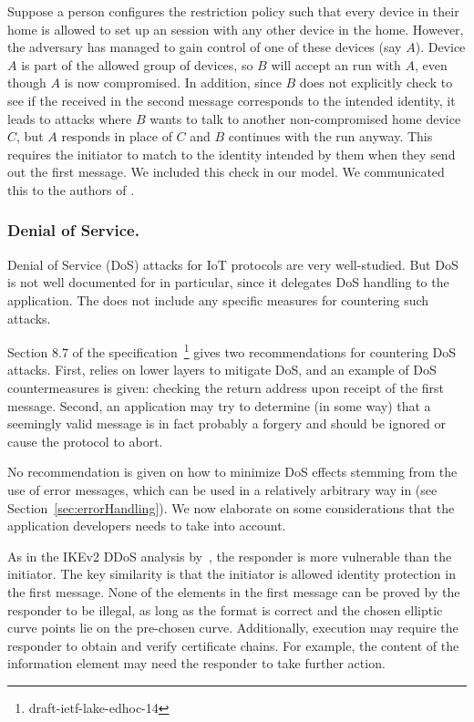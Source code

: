 \documentclass[runningheads]{llncs}
\begin{document}
Suppose a person configures the restriction policy such that every device in their home is allowed to set up an \mEdhoc{} session with any other device in the home.
%
However, the adversary has managed to gain control of one of these devices (say $A$).
%
Device $A$ is part of the allowed group of devices, so $B$ will accept an \mEdhoc{} run with $A$, even though $A$ is now compromised.
%
In addition, since $B$ does not explicitly check to see if the \mIdcredr{} received in the second message corresponds to the intended identity, it leads to attacks where $B$ wants to talk to another non-compromised home device $C$, but $A$ responds in place of $C$ and $B$ continues with the run anyway.
%
This requires the initiator to match \mIdcredr{} to the identity intended by them when they send out the first message.
%
We included this check in our model.
%
We communicated this to the authors of \mEdhoc{}.

\subsubsection{Denial of Service.}
Denial of Service (DoS) attacks for IoT protocols are very well-studied.
%
But DoS is not well documented for \mEdhoc{} in particular, since it delegates DoS handling to the application.
%
The \mSpec{} does not include any specific measures for countering such attacks.

Section 8.7 of the \mEdhoc{} specification~\footnote{draft-ietf-lake-edhoc-14} gives two recommendations for countering DoS attacks.
%
First, \mEdhoc{} relies on lower layers to mitigate DoS, and an example of DoS countermeasures is given: checking the return address upon receipt of the first message.
%
Second, an application may try to determine (in some way) that a seemingly valid message is in fact probably a forgery and should be ignored or cause the protocol to abort.

No recommendation is given on how to minimize DoS effects stemming from the use of error messages, which can be used in a relatively arbitrary way in \mEdhoc{} (see Section~\ref{sec:errorHandling}).
%
We now elaborate on some considerations that the application developers needs to take into account.
%

As in the IKEv2 DDoS analysis by~\cite{rfc8019}, the responder is more vulnerable than the initiator.
%
The key similarity is that the initiator is allowed identity protection in the first message.
%
None of the elements in the first \mEdhoc{} message can be proved by the responder to be illegal, as long as the format is correct and the chosen elliptic curve points lie on the pre-chosen curve.
%
Additionally, execution may require the responder to obtain and verify certificate chains.
%
For example, the content of the \mADone{} information element may need the responder to take further action.
%
\end{document}
